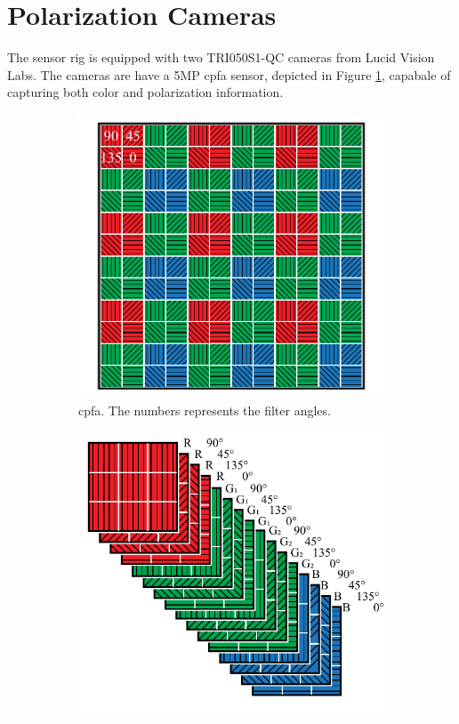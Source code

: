 \section{Polarization Cameras}
The sensor rig is equipped with two TRI050S1-QC cameras from Lucid Vision Labs.
The cameras are have a 5MP \gls{cpfa} sensor, depicted in Figure \ref{fig:cpfa}, capabale of capturing both color and polarization information.

\begin{figure}[H]
    \begin{subfigure}[B]{.48\textwidth}
        \centering
        \includegraphics[width=\textwidth]{figures/sensor_layout.pdf}
        \caption{\gls{cpfa}. The numbers represents the filter angles.\label{fig:cpfa}}
    \end{subfigure}
    \hfill
    \begin{subfigure}[B]{.48\textwidth}
        \includegraphics[width=\textwidth]{figures/sensor_packaging.pdf}

\end{subfigure}
\end{figure}
